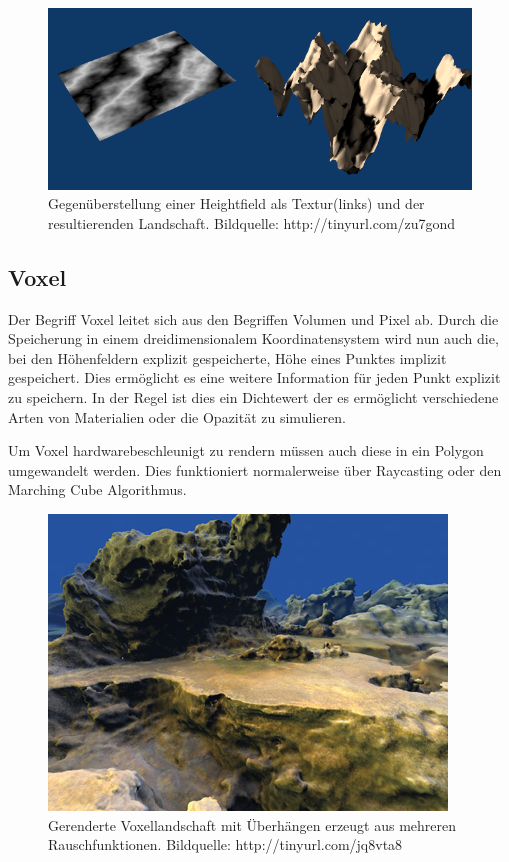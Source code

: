\begin{figure}
	\centering
	\includegraphics[width=\textwidth]{images/heightfield_rendered.png}
	\caption{Gegenüberstellung einer Heightfield als Textur(links) und der resultierenden Landschaft. Bildquelle: http://tinyurl.com/zu7gond}\label{img.heightfield}
\end{figure}

\subsection{Voxel}
Der Begriff Voxel leitet sich aus den Begriffen Volumen und Pixel ab.
Durch die Speicherung in einem dreidimensionalem Koordinatensystem wird nun auch die, bei den Höhenfeldern explizit gespeicherte, Höhe eines Punktes implizit gespeichert. Dies ermöglicht es eine weitere Information für jeden Punkt explizit zu speichern. In der Regel ist dies ein Dichtewert der es ermöglicht verschiedene Arten von Materialien oder die Opazität zu simulieren.

Um Voxel hardwarebeschleunigt zu rendern müssen auch diese in ein Polygon umgewandelt werden. Dies funktioniert normalerweise über Raycasting oder den Marching Cube Algorithmus.

\begin{figure}
	\centering
	\includegraphics[width=\textwidth]{images/voxel_rendered.jpg}
	\caption{Gerenderte Voxellandschaft mit Überhängen erzeugt aus mehreren Rauschfunktionen. Bildquelle: http://tinyurl.com/jq8vta8}\label{img.heightfield}
\end{figure}

